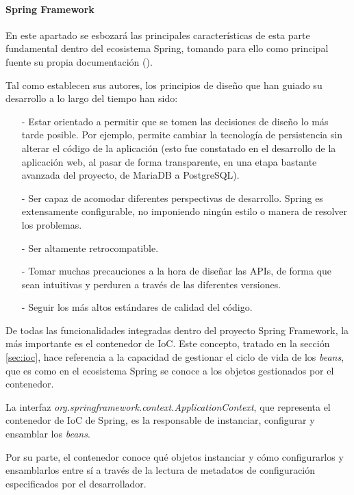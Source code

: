 \documentclass[a4paper,12pt,twoside,openright]{report}
\begin{document}
    \paragraph{Spring Framework} 
    En este apartado se esbozará las principales características de esta parte fundamental dentro del ecosistema Spring, tomando para ello como principal fuente su propia documentación (\cite{Johnson2020}).
    
    Tal como establecen sus autores, los principios de diseño que han guiado su desarrollo a lo largo del tiempo han sido:
    
    \begin{itemize}
    	\item[-] Estar orientado a permitir que se tomen las decisiones de diseño lo más tarde posible. Por ejemplo, permite cambiar la tecnología de persistencia sin alterar el código de la aplicación (esto fue constatado en el desarrollo de la aplicación web, al pasar de forma transparente, en una etapa bastante avanzada del proyecto, de MariaDB a PostgreSQL).
    	\item[-] Ser capaz de acomodar diferentes perspectivas de desarrollo. Spring es extensamente configurable, no imponiendo ningún estilo o manera de resolver los problemas.
    	\item[-] Ser altamente retrocompatible.
    	\item[-] Tomar muchas precauciones a la hora de diseñar las APIs, de forma que sean intuitivas y perduren a través de las diferentes versiones.
    	\item[-] Seguir los más altos estándares de calidad del código.
    \end{itemize}
    
    De todas las funcionalidades integradas dentro del proyecto Spring Framework, la más importante es el contenedor de IoC. Este concepto, tratado en la sección \ref{sec:ioc}, hace referencia a la capacidad de gestionar el ciclo de vida de los \emph{beans}, que es como en el ecosistema Spring se conoce a los objetos gestionados por el contenedor.
    
    La interfaz \emph{org.springframework.context.ApplicationContext}, que representa el contenedor de IoC de Spring, es la responsable de instanciar, configurar y ensamblar los \emph{beans}.
    
    Por su parte, el contenedor conoce qué objetos instanciar y cómo configurarlos y ensamblarlos entre sí a través de la lectura de metadatos de configuración especificados por el desarrollador.
    
\end{document}

